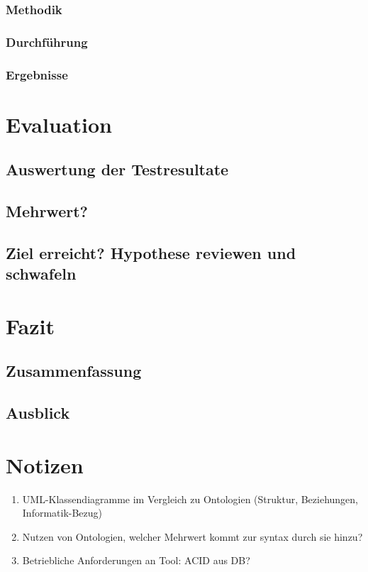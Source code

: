 \documentclass[12pt]{report}
\begin{document}
\subsection{Methodik}
\subsection{Durchführung}
\subsection{Ergebnisse}
\chapter{Evaluation}
\section{Auswertung der Testresultate}
\section{Mehrwert?}
\section{Ziel erreicht? Hypothese reviewen und schwafeln}
\chapter{Fazit}
\section{Zusammenfassung}
\section{Ausblick}

\chapter{Notizen}
\begin{enumerate}
\item UML-Klassendiagramme im Vergleich zu Ontologien (Struktur, Beziehungen, Informatik-Bezug)
\item Nutzen von Ontologien, welcher Mehrwert kommt zur syntax durch sie hinzu?
\item Betriebliche Anforderungen an Tool: ACID aus DB? 
\end{enumerate}
\end{document}
